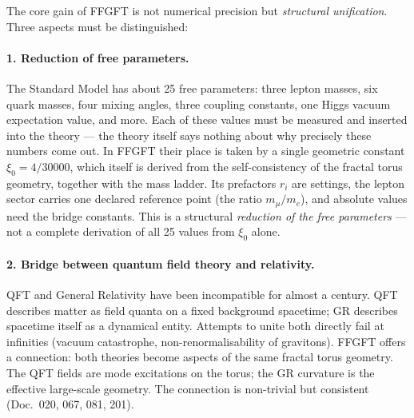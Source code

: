 The core gain of FFGFT is not numerical precision but
\emph{structural unification}. Three aspects must be distinguished:

\paragraph{1. Reduction of free parameters.}
The Standard Model has about 25 free parameters: three lepton
masses, six quark masses, four mixing angles, three coupling
constants, one Higgs vacuum expectation value, and more. Each of
these values must be measured and inserted into the theory --- the
theory itself says nothing about why precisely these numbers come
out. In FFGFT their place is taken by a single geometric constant
$\xi_0 = 4/30000$, which itself is derived from the self-consistency
of the fractal torus geometry, together with the mass ladder. Its
prefactors $r_i$ are settings, the lepton sector carries one declared
reference point (the ratio $m_\mu/m_e$), and absolute values need the
bridge constants. This is a structural \emph{reduction of the free
parameters} --- not a complete derivation of all 25 values from
$\xi_0$ alone.

\paragraph{2. Bridge between quantum field theory and relativity.}
QFT and General Relativity have been incompatible for almost a
century. QFT describes matter as field quanta on a fixed background
spacetime; GR describes spacetime itself as a dynamical entity.
Attempts to unite both directly fail at infinities (vacuum
catastrophe, non-renormalisability of gravitons). FFGFT offers a
connection: both theories become aspects of the same fractal torus
geometry. The QFT fields are mode excitations on the torus; the GR
curvature is the effective large-scale geometry. The connection is
non-trivial but consistent (Doc.~020, 067, 081, 201).


